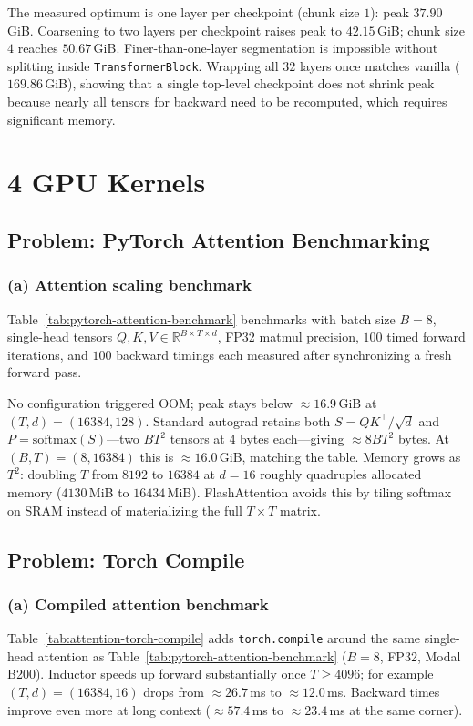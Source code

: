 \documentclass[11pt]{article}
\newcommand{\question}[1]{\subsection*{#1}}
\newcommand{\subquestion}[1]{\subsubsection*{#1}}
\begin{document}
The measured optimum is one layer per checkpoint (chunk size $1$): peak $37.90$\,GiB. Coarsening to two layers per checkpoint raises peak to $42.15$\,GiB; chunk size $4$ reaches $50.67$\,GiB. Finer-than-one-layer segmentation is impossible without splitting inside \texttt{TransformerBlock}. Wrapping all $32$ layers once matches vanilla ($169.86$\,GiB), showing that a single top-level checkpoint does not shrink peak because nearly all tensors for backward need to be recomputed, which requires significant memory.

\section*{4 GPU Kernels}

\question{Problem: PyTorch Attention Benchmarking}
\subquestion{(a) Attention scaling benchmark}
Table~\ref{tab:pytorch-attention-benchmark} benchmarks with batch size $B{=}8$, single-head tensors $Q,K,V\in\mathbb{R}^{B\times T\times d}$, FP32 matmul precision, $100$ timed forward iterations, and $100$ backward timings each measured after synchronizing a fresh forward pass.

\begin{table}[H]
  \centering
  \resizebox{\textwidth}{!}{}
  \caption{Mean forward/backward latency per iteration (ms) and CUDA bytes allocated before the first backward for dense dot-product attention ($B{=}8$, head dimension $d\in\{16,32,64,128\}$, sequence length $T$). No grid point triggered OOM on this GPU.}
  \label{tab:pytorch-attention-benchmark}
\end{table}

No configuration triggered OOM; peak stays below $\approx16.9$\,GiB at $(T,d)=(16384,128)$. Standard autograd retains both $S=QK^{\top}/\sqrt{d}$ and $P=\mathrm{softmax}(S)$---two $BT^{2}$ tensors at 4 bytes each---giving $\approx8BT^{2}$ bytes. At $(B,T)=(8,16384)$ this is $\approx16.0$\,GiB, matching the table. Memory grows as $T^{2}$: doubling $T$ from $8192$ to $16384$ at $d{=}16$ roughly quadruples allocated memory ($4130$\,MiB to $16434$\,MiB). FlashAttention avoids this by tiling softmax on SRAM instead of materializing the full $T\times T$ matrix.

\question{Problem: Torch Compile}
\subquestion{(a) Compiled attention benchmark}
Table~\ref{tab:attention-torch-compile} adds \texttt{torch.compile} around the same single-head attention as Table~\ref{tab:pytorch-attention-benchmark} ($B{=}8$, FP32, Modal B200). Inductor speeds up forward substantially once $T\ge4096$; for example $(T,d){=}(16384,16)$ drops from $\approx26.7$\,ms to $\approx12.0$\,ms. Backward times improve even more at long context ($\approx57.4$\,ms to $\approx23.4$\,ms at the same corner).
\end{document}
